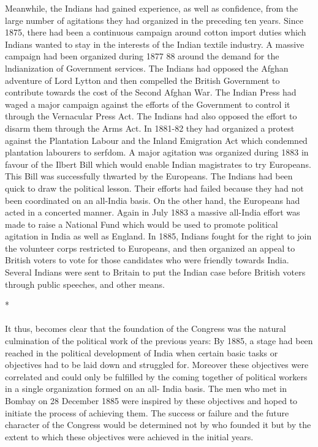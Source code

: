 Meanwhile, the Indians had gained experience, as well as confidence, from the large number of agitations they had organized in the preceding ten years. Since 1875, there had been a continuous campaign around cotton import duties which Indians wanted to stay in the interests of the Indian textile industry. A massive campaign had been organized during 1877­ 88 around the demand for the lndianization of Government services. The Indians had opposed the Afghan adventure of Lord Lytton and then compelled the British Government to contribute towards the cost of the Second Afghan War. The Indian Press had waged a major campaign against the efforts of the Government to control it through the Vernacular Press Act. The Indians had also opposed the effort to disarm them through the Arms Act. In 1881-82 they had organized a protest against the Plantation Labour and the Inland Emigration Act which condemned plantation labourers to serfdom. A major agitation was organized during 1883 in favour of the Ilbert Bill which would enable Indian magistrates to try Europeans. This Bill was successfully thwarted by the Europeans. The Indians had been quick to draw the political lesson. Their efforts had failed because they had not been coordinated on an all-India basis. On the other hand, the Europeans had acted in a concerted manner. Again in July 1883 a massive all-India effort was made to raise a National Fund which would be used to promote political agitation in India as well as England. In 1885, Indians fought for the right to join the volunteer corps restricted to Europeans, and then organized an appeal to British voters to vote for those candidates who were friendly towards India. Several Indians were sent to Britain to put the Indian case before British voters through public speeches, and other means.

\begin{center}*\end{center}

\paragraph*{}


It thus, becomes clear that the foundation of the Congress was the natural culmination of the political work of the previous years: By 1885, a stage had been reached in the political development of India when certain basic tasks or objectives had to be laid down and struggled for. Moreover these objectives were correlated and could only be fulfilled by the coming together of political workers in a single organization formed on an all- India basis. The men who met in Bombay on 28 December 1885 were inspired by these objectives and hoped to initiate the process of achieving them. The success or failure and the future character of the Congress would be determined not by who founded it but by the extent to which these objectives were achieved in the initial years.


